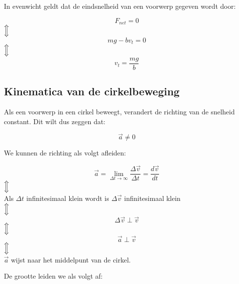 \documentclass[12pt,a4paper]{article}
\newcommand{\Luda}{\Big\Updownarrow}
\begin{document}
   In evenwicht geldt dat de eindsnelheid van een voorwerp gegeven wordt door:
   
   \begin{center}
   	 \[F_{net} = 0\]
	  $\Luda$\[mg - bv_{t} = 0\]
	  $\Luda$\[v_{t} = \frac{mg}{b}\]
    \end{center}	  

    \subsection{Kinematica van de cirkelbeweging}
    Als een voorwerp in een cirkel beweegt, verandert de richting van de snelheid constant. Dit wilt dus zeggen dat:
    
    $$ \vec{a} \neq 0$$
    
    We kunnen de richting als volgt afleiden:
    
    \begin{center}
    	\[\vec{a} = \lim_{\Delta t\to\infty} \frac{\Delta \vec{v}}{\Delta t} = \frac{d\vec{v}}{dt}\]
    	$\Luda$\\
    	Als $\Delta t$ infinitesimaal klein wordt is $\Delta \vec{v}$ infinitesimaal klein\\
    	$\Luda$\[\Delta\vec{v} \perp \vec{v}\]
    	$\Luda$\[\vec{a} \perp \vec{v}\]
    	$\Luda$\\ 
    	$\vec{a}$ wijst naar het middelpunt van de cirkel.
    \end{center}
    
    De grootte leiden we als volgt af:
    
\end{document}
